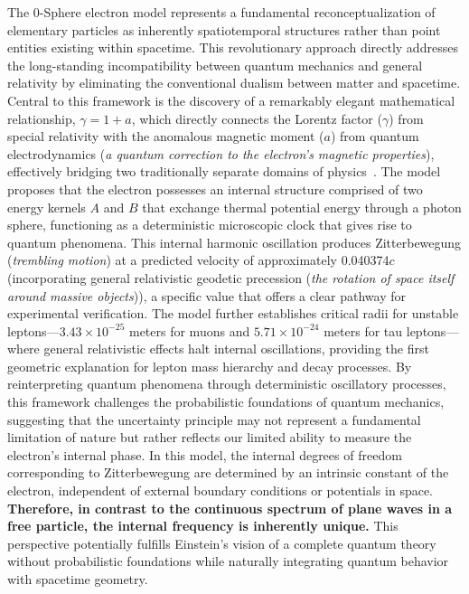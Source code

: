 \documentclass[12pt,letterpaper]{article} %
\begin{document}
The 0-Sphere electron model represents a fundamental reconceptualization of elementary particles as inherently spatiotemporal structures rather than point entities existing within spacetime. This revolutionary approach directly addresses the long-standing incompatibility between quantum mechanics and general relativity by eliminating the conventional dualism between matter and spacetime. Central to this framework is the discovery of a remarkably elegant mathematical relationship, $\gamma = 1 + a$, which directly connects the Lorentz factor ($\gamma$) from special relativity with the anomalous magnetic moment ($a$) from quantum electrodynamics (\textit{a quantum correction to the electron's magnetic properties}), effectively bridging two traditionally separate domains of physics~\cite{hanamura2023}. The model proposes that the electron possesses an internal structure comprised of two energy kernels $A$ and $B$ that exchange thermal potential energy through a photon sphere, functioning as a deterministic microscopic clock that gives rise to quantum phenomena. This internal harmonic oscillation produces Zitterbewegung (\textit{trembling motion}) at a predicted velocity of approximately 0.040374$c$ (incorporating general relativistic geodetic precession (\textit{the rotation of space itself around massive objects})), a specific value that offers a clear pathway for experimental verification. The model further establishes critical radii for unstable leptons—$3.43 \times 10^{-25}$ meters for muons and $5.71 \times 10^{-24}$ meters for tau leptons—where general relativistic effects halt internal oscillations, providing the first geometric explanation for lepton mass hierarchy and decay processes. By reinterpreting quantum phenomena through deterministic oscillatory processes, this framework challenges the probabilistic foundations of quantum mechanics, suggesting that the uncertainty principle may not represent a fundamental limitation of nature but rather reflects our limited ability to measure the electron's internal phase. In this model, the internal degrees of freedom corresponding to Zitterbewegung are determined by an intrinsic constant of the electron, independent of external boundary conditions or potentials in space. \textbf{Therefore, in contrast to the continuous spectrum of plane waves in a free particle, the internal frequency is inherently unique.} This perspective potentially fulfills Einstein's vision of a complete quantum theory without probabilistic foundations while naturally integrating quantum behavior with spacetime geometry.
\end{document}
